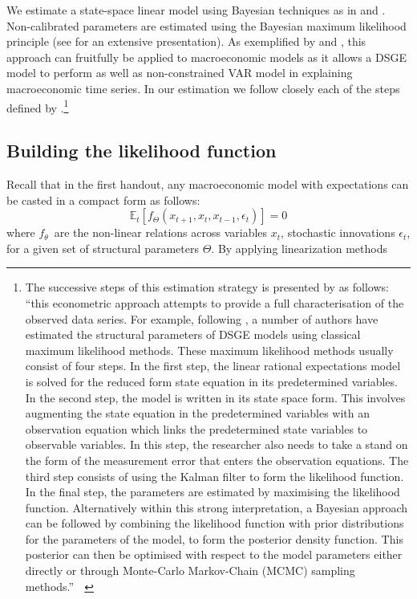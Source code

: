 \documentclass[a4paper,12pt]{article}%
\begin{document}
We estimate a state-space linear model using Bayesian techniques as in
\cite{fernandez2004comparing} and \cite{smets2007shocks}. Non-calibrated
parameters are estimated using the Bayesian maximum likelihood principle (see
\cite{an2007bayesian} for an extensive presentation). As exemplified by
\cite{smets2003estimated} and \cite{smets2007shocks}, this approach can
fruitfully be applied to macroeconomic models as it allows a DSGE model to
perform as well as non-constrained VAR model in explaining macroeconomic time
series. In our estimation we follow closely each of the steps defined by
\cite{smets2003estimated}.\footnote{The successive steps of this estimation
strategy is presented by \cite{smets2003estimated} as follows:
\textquotedblleft this econometric approach attempts to provide a full
characterisation of the observed data series. For example, following
\cite{sargent1989two}, a number of authors have estimated the structural
parameters of DSGE models using classical maximum likelihood methods. These
maximum likelihood methods usually consist of four steps. In the first step,
the linear rational expectations model is solved for the reduced form state
equation in its predetermined variables. In the second step, the model is
written in its state space form. This involves augmenting the state equation
in the predetermined variables with an observation equation which links the
predetermined state variables to observable variables. In this step, the
researcher also needs to take a stand on the form of the measurement error
that enters the observation equations. The third step consists of using the
Kalman filter to form the likelihood function. In the final step, the
parameters are estimated by maximising the likelihood function. Alternatively
within this strong interpretation, a Bayesian approach can be followed by
combining the likelihood function with prior distributions for the parameters
of the model, to form the posterior density function. This posterior can then
be optimised with respect to the model parameters either directly or through
Monte-Carlo Markov-Chain (MCMC) sampling methods.\textquotedblright\ $\ \ $}

\subsection{Building the likelihood function}

Recall that in the first handout, any macroeconomic model with expectations
can be casted in a compact form as follows:%
\begin{equation}
\mathbb{E}_{t}\left[  f_{\Theta}\left(  x_{t+1},x_{t},x_{t-1},\epsilon
_{t}\right)  \right]  =0 \label{eq non linear system}%
\end{equation}
where $f_{\theta}$\ are the non-linear relations across variables $x_{t}$,
stochastic innovations $\epsilon_{t}$, for a given set of structural
parameters $\Theta$. By applying linearization methods
\end{document}
